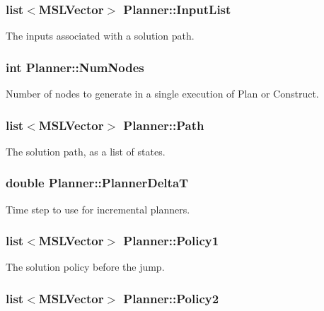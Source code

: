 \subsubsection{\setlength{\rightskip}{0pt plus 5cm}list$<${\bf MSLVector}$>$ Planner::Input\-List}\label{classPlanner_m16}


The inputs associated with a solution path.

\subsubsection{\setlength{\rightskip}{0pt plus 5cm}int Planner::Num\-Nodes}\label{classPlanner_m17}


Number of nodes to generate in a single execution of Plan or Construct.

\subsubsection{\setlength{\rightskip}{0pt plus 5cm}list$<${\bf MSLVector}$>$ Planner::Path}\label{classPlanner_m2}


The solution path, as a list of states.

\subsubsection{\setlength{\rightskip}{0pt plus 5cm}double Planner::Planner\-Delta\-T}\label{classPlanner_m18}


Time step to use for incremental planners.

\subsubsection{\setlength{\rightskip}{0pt plus 5cm}list$<${\bf MSLVector}$>$ Planner::Policy1}\label{classPlanner_m4}


The solution policy before the jump.

\subsubsection{\setlength{\rightskip}{0pt plus 5cm}list$<${\bf MSLVector}$>$ Planner::Policy2}\label{classPlanner_m6}


